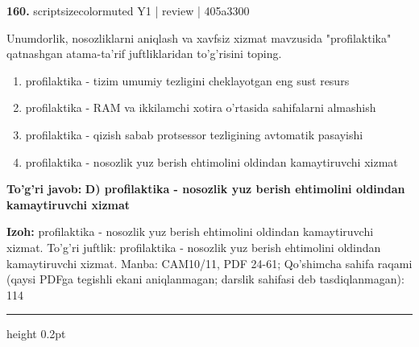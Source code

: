 \documentclass[10pt,a4paper]{article}
\begin{document}
{\bfseries\sffamily\color{ink} 160.} {scriptsizecolor{muted} Y1 | review | 405a3300}
\par
Unumdorlik, nosozliklarni aniqlash va xavfsiz xizmat mavzusida "profilaktika" qatnashgan atama-ta'rif juftliklaridan to'g'risini toping.
\begin{enumerate}[label=\Alph*),leftmargin=9mm]
\item profilaktika - tizim umumiy tezligini cheklayotgan eng sust resurs
\item profilaktika - RAM va ikkilamchi xotira o'rtasida sahifalarni almashish
\item profilaktika - qizish sabab protsessor tezligining avtomatik pasayishi
\item profilaktika - nosozlik yuz berish ehtimolini oldindan kamaytiruvchi xizmat
\end{enumerate}
\begin{tcolorbox}[enhanced,breakable,colback=teal!4,colframe=teal!60!black,boxrule=0.45pt,arc=1.2mm,left=2.7mm,right=2.7mm,top=1.8mm,bottom=1.8mm,before skip=2mm,after skip=2mm]
{\bfseries\sffamily\color{teal}To'g'ri javob:} \textbf{D) profilaktika - nosozlik yuz berish ehtimolini oldindan kamaytiruvchi xizmat}
\par\smallskip
{\bfseries Izoh:} profilaktika - nosozlik yuz berish ehtimolini oldindan kamaytiruvchi xizmat. To'g'ri juftlik: profilaktika - nosozlik yuz berish ehtimolini oldindan kamaytiruvchi xizmat. Manba: CAM10/11, PDF 24-61; Qo'shimcha sahifa raqami (qaysi PDFga tegishli ekani aniqlanmagan; darslik sahifasi deb tasdiqlanmagan): 114
\end{tcolorbox}
\vspace{2mm}\hrule height 0.2pt\vspace{3mm}
\end{document}
